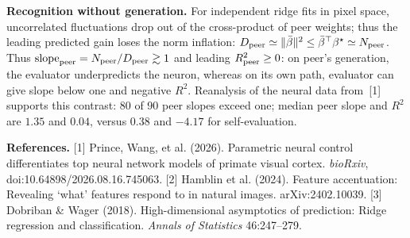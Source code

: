 \documentclass[12pt,a4paper]{article}
\newcommand{\head}[1]{\par\noindent\textbf{#1}\enspace\ignorespaces}
\newcommand{\bt}{\beta^\star}
\newcommand{\mb}{\bar\beta}
\begin{document}
\head{Recognition without generation.}
For independent ridge fits in pixel space, uncorrelated fluctuations drop out of the cross-product of peer weights; thus the leading predicted gain loses the norm inflation: $D_{\rm peer}\simeq\|\mb\|^2\le\mb^\top\bt\simeq N_{\rm peer}$. Thus $\mathrm{slope}_{\rm peer}=N_{\rm peer}/D_{\rm peer}\gtrsim1$ and leading $R^2_{\rm peer}\ge0$: on peer's generation, the evaluator underpredicts the neuron, whereas on its own path, evaluator can give slope below one and negative $R^2$. Reanalysis of the neural data from~[1] supports this contrast: 80 of 90 peer slopes exceed one; median peer slope and $R^2$ are $1.35$ and $0.04$, versus $0.38$ and $-4.17$ for self-evaluation. %

\vspace{2pt}
{\fontsize{10}{11}\selectfont
\textbf{References.}
[1] Prince, Wang, et al. (2026). Parametric neural control differentiates top neural network models of primate visual cortex. \emph{bioRxiv}, doi:10.64898/2026.08.16.745063.
[2] Hamblin et al. (2024). Feature accentuation: Revealing `what' features respond to in natural images. arXiv:2402.10039.
[3] Dobriban \& Wager (2018). High-dimensional asymptotics of prediction: Ridge regression and classification. \emph{Annals of Statistics} 46:247--279.
\par}
\end{document}
